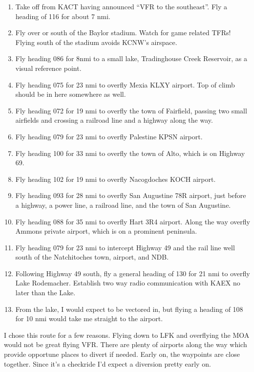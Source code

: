 \begin{enumerate}
    \item Take off from KACT having announced ``VFR to the southeast''. Fly a heading of 116 for about 7 nmi.
    \item Fly over or south of the Baylor stadium. Watch for game related TFRs! Flying south of the stadium avoids KCNW's airspace.
    \item Fly heading 086 for 8nmi to a small lake, Tradinghouse Creek Reservoir, as a visual reference point.
    \item Fly heading 075 for 23 nmi to overfly Mexia KLXY airport. Top of climb should be in here somewhere as well.
    \item Fly heading 072 for 19 nmi to overfly the town of Fairfield, passing two small airfields and crossing a railroad line and a highway along the way.
    \item Fly heading 079 for 23 nmi to overfly Palestine KPSN airport.
    \item Fly heading 100 for 33 nmi to overfly the town of Alto, which is on Highway 69.
    \item Fly heading 102 for 19 nmi to overfly Nacogdoches KOCH airport.
    \item Fly heading 093 for 28 nmi to overfly San Augustine 78R airport, just before a highway, a power line, a railroad line, and the town of San Augustine.
    \item Fly heading 088 for 35 nmi to overfly Hart 3R4 airport. Along the way overfly Ammons private airport, which is on a prominent peninsula.
    \item Fly heading 079 for 23 nmi to intercept Highway 49 and the rail line well south of the Natchitoches town, airport, and NDB.
    \item Following Highway 49 south, fly a general heading of 130 for 21 nmi to overfly Lake Rodemacher. Establish two way radio communication with KAEX no later than the Lake.
    \item From the lake, I would expect to be vectored in, but flying a heading of 108 for 10 nmi would take me straight to the airport.
\end{enumerate}

I chose this route for a few reasons. Flying down to LFK and overflying the MOA would not be great flying VFR. There are plenty of airports along the way which provide opportune places to divert if needed. Early on, the waypoints are close together. Since it's a checkride I'd expect a diversion pretty early on.

